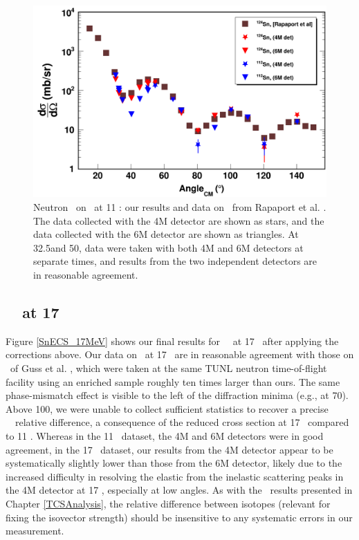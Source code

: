 \begin{figure}[tb]
    \centering
    \includegraphics[width = 1.0\textwidth]{figures/ECSResults2017.png}
    \caption[Neutron \el\ on \snTwelveFour at 11 \mega\electronvolt: our results and literature data]
    {
        Neutron \el\ on \snTwelveFour\ at 11 \mega\electronvolt: our results and data on
        \snFour\ from Rapaport et al. \cite{Rapaport1980}. The data collected
        with the 4M detector are shown as stars, and the data collected
        with the 6M detector are shown as triangles. At 32.5\textdegree and
        50\textdegree, data were taken with both 4M and 6M detectors at separate
        times, and results from the two independent detectors are in reasonable agreement.
    }
    \label{SnECS_11MeV}
\end{figure}

\subsection{\snTwelveFour\ \el\ at 17 \mega\electronvolt}
Figure \ref{SnECS_17MeV} shows our final results for \snTwelveFour\
\el\ at 17 \mega\electronvolt\ after applying the corrections above. Our data on \snFour\
at 17 \mega\electronvolt\ are in reasonable agreement with those on \snTwenty\ of Guss et al.
\cite{Guss1989, GussPhDThesis}, which were taken at the same TUNL neutron
time-of-flight facility using an enriched sample roughly ten
times larger than ours. The same phase-mismatch effect is visible to the left of
the diffraction minima (e.g., at 70\textdegree). Above 100\textdegree, we were unable
to collect sufficient statistics to recover a precise \snTwelveFour\ \el\
relative difference, a consequence of the reduced cross section at 17 \mega\electronvolt\
compared to 11 \mega\electronvolt. Whereas in the 11 \mega\electronvolt\ dataset, the 4M and 6M detectors were in
good agreement, in the 17 \mega\electronvolt\ dataset, our results from the 4M detector appear
to be systematically slightly lower than those from the 6M detector, likely due to the
increased difficulty in resolving the elastic from the inelastic scattering
peaks in the 4M detector at 17 \mega\electronvolt, especially at low angles. As with the \tot\
results presented in Chapter \ref{TCSAnalysis}, the relative difference between
isotopes (relevant for fixing the isovector strength) should be insensitive to any systematic 
errors in our measurement.

